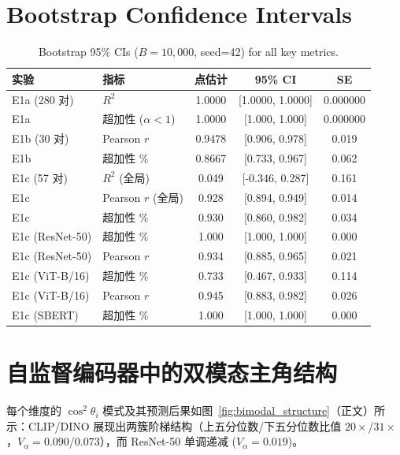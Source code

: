 \documentclass{article}
\begin{document}
\section{Bootstrap Confidence Intervals}
\label{app:bootstrap}

\begin{table}[h]
\centering
\caption{Bootstrap 95\% CIs ($B=10{,}000$, seed=42) for all key metrics.}
\label{tab:bootstrap_ci}
\begin{tabular}{llccc}
\toprule
实验 & 指标 & 点估计 & 95\% CI & SE \\
\midrule
E1a (280 对)  & $R^2$                  & 1.0000 & [1.0000, 1.0000] & 0.000000 \\
E1a                & 超加性 ($\alpha<1$)     & 1.0000 & [1.000, 1.000]  & 0.000000 \\
E1b (30 对)       & Pearson $r$             & 0.9478 & [0.906, 0.978]  & 0.019 \\
E1b                & 超加性 \%               & 0.8667 & [0.733, 0.967]  & 0.062 \\
E1c (57 对)       & $R^2$ (全局)            & 0.049  & [-0.346, 0.287] & 0.161 \\
E1c                & Pearson $r$ (全局)      & 0.928  & [0.894, 0.949]  & 0.014 \\
E1c                & 超加性 \%               & 0.930  & [0.860, 0.982]  & 0.034 \\
E1c (ResNet-50)   & 超加性 \%               & 1.000  & [1.000, 1.000]  & 0.000 \\
E1c (ResNet-50)   & Pearson $r$             & 0.934  & [0.885, 0.965]  & 0.021 \\
E1c (ViT-B/16)    & 超加性 \%               & 0.733  & [0.467, 0.933]  & 0.114 \\
E1c (ViT-B/16)    & Pearson $r$             & 0.945  & [0.883, 0.982]  & 0.026 \\
E1c (SBERT)       & 超加性 \%               & 1.000  & [1.000, 1.000]  & 0.000 \\
\bottomrule
\end{tabular}
\end{table}
\section{自监督编码器中的双模态主角结构}
\label{app:bimodal}

每个维度的 $\cos^2\theta_i$ 模式及其预测后果如图~\ref{fig:bimodal_structure}（正文）所示：CLIP/DINO 展现出两簇阶梯结构（上五分位数/下五分位数比值 $20{\times}$/$31{\times}$，$V_\alpha{=}0.090$/$0.073$），而 ResNet-50 单调递减 ($V_\alpha{=}0.019$)。
\end{document}
